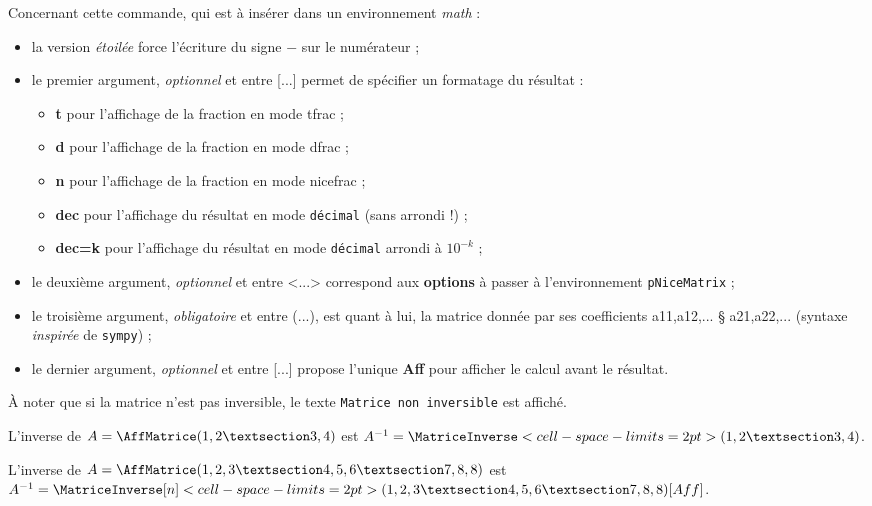 \documentclass[french,a4paper,11pt]{article}
\newcommand\Cle[1]{{\bfseries\sffamily\textlangle #1\textrangle}}
\newcommand\cmaj[1]{\tcbox[vignetteMaJ]{#1}\xspace}
\begin{document}
\begin{tipblock}
Concernant cette commande, qui est à insérer dans un environnement \textit{math} :

\begin{itemize}
	\item \cmaj{0.1.3} la version \textit{étoilée} force l'écriture du signe \og $-$ \fg{} sur le numérateur ;
	\item le premier argument, \textit{optionnel} et entre \textsf{[...]} permet de spécifier un formatage du résultat :
	\begin{itemize}
		\item \Cle{t} pour l'affichage de la fraction en mode \textsf{tfrac} ;
		\item \Cle{d} pour l'affichage de la fraction en mode \textsf{dfrac} ;
		\item \Cle{n} pour l'affichage de la fraction en mode \textsf{nicefrac} ;
		\item \Cle{dec} pour l'affichage du résultat en mode \texttt{décimal} (sans arrondi !) ;
		\item \Cle{dec=k} pour l'affichage du résultat en mode \texttt{décimal} arrondi à $10^{-k}$ ;
	\end{itemize}
	\item le deuxième argument, \textit{optionnel} et entre \textsf{<...>} correspond aux \Cle{options} à passer à l'environnement \texttt{pNiceMatrix} ;
	\item le troisième argument, \textit{obligatoire} et entre \textsf{(...)}, est quant à lui, la matrice donnée par ses coefficients \textsf{a11,a12,... § a21,a22,...} (syntaxe \textit{inspirée} de \texttt{sympy}) ;
	\item le dernier argument, \textit{optionnel} et entre \textsf{[...]} propose l'unique  \Cle{Aff} pour afficher le calcul avant le résultat.
\end{itemize}
À noter que si la matrice n'est pas inversible, le texte \texttt{Matrice non inversible} est affiché.
\end{tipblock}

\begin{PresentationCode}{}
L'inverse de $A=\AffMatrice(1,2 § 3,4)$ est
$A^{-1}=\MatriceInverse<cell-space-limits=2pt>(1,2 § 3,4)$.
\end{PresentationCode}

\begin{PresentationCode}{}
L'inverse de $A=\AffMatrice(1,2,3 § 4,5,6 § 7,8,8)$ est
$A^{-1}=\MatriceInverse[n]<cell-space-limits=2pt>(1,2,3 § 4,5,6 § 7,8,8)[Aff]$.
\end{PresentationCode}
\end{document}
